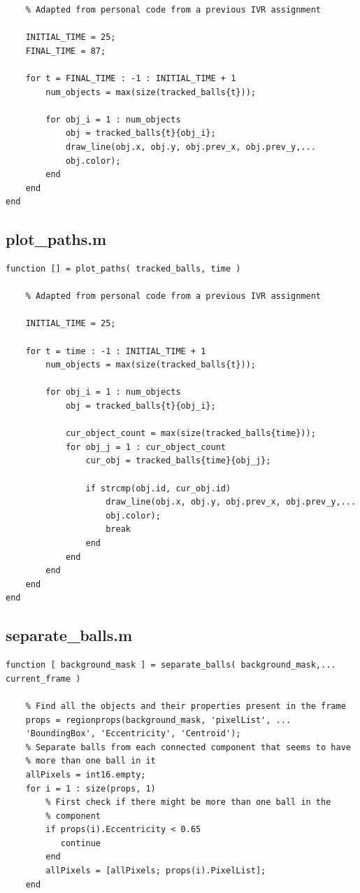 \documentclass[12pt,a4paper]{article}
\begin{document}
\begin{appendices}
\begin{verbatim}
    % Adapted from personal code from a previous IVR assignment

    INITIAL_TIME = 25;
    FINAL_TIME = 87;

    for t = FINAL_TIME : -1 : INITIAL_TIME + 1
        num_objects = max(size(tracked_balls{t}));

        for obj_i = 1 : num_objects
            obj = tracked_balls{t}{obj_i};
            draw_line(obj.x, obj.y, obj.prev_x, obj.prev_y,...
            obj.color); 
        end
    end
end
\end{verbatim}

\subsection{plot\_paths.m}
\begin{verbatim}
function [] = plot_paths( tracked_balls, time )

    % Adapted from personal code from a previous IVR assignment

    INITIAL_TIME = 25;

    for t = time : -1 : INITIAL_TIME + 1
        num_objects = max(size(tracked_balls{t}));

        for obj_i = 1 : num_objects
            obj = tracked_balls{t}{obj_i};
            
            cur_object_count = max(size(tracked_balls{time}));
            for obj_j = 1 : cur_object_count
                cur_obj = tracked_balls{time}{obj_j};

                if strcmp(obj.id, cur_obj.id)
                    draw_line(obj.x, obj.y, obj.prev_x, obj.prev_y,...
                    obj.color); 
                    break
                end
            end
        end
    end
end
\end{verbatim}

\subsection{separate\_balls.m}
\begin{verbatim}
function [ background_mask ] = separate_balls( background_mask,...
current_frame )
    
    % Find all the objects and their properties present in the frame
    props = regionprops(background_mask, 'pixelList', ...
    'BoundingBox', 'Eccentricity', 'Centroid');
    % Separate balls from each connected component that seems to have
    % more than one ball in it
    allPixels = int16.empty;
    for i = 1 : size(props, 1)
        % First check if there might be more than one ball in the 
        % component
        if props(i).Eccentricity < 0.65
           continue
        end
        allPixels = [allPixels; props(i).PixelList];
    end
    

\end{verbatim}
\end{appendices}
\end{document}
